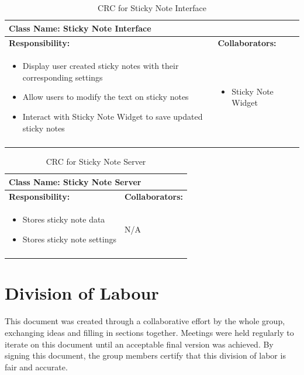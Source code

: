 \documentclass[]{article}
\begin{document}
\begin{longtable}{| p{} | p{} |}
	\hline
	\multicolumn{2}{|l|}{\textbf{Class Name: Sticky Note Interface}} \\
	\hline
	\textbf{Responsibility:} & \textbf{Collaborators:} \\
	\hline
	\begin{itemize}
		\item Display user created sticky notes with their corresponding settings
		\item Allow users to modify the text on sticky notes
		\item Interact with Sticky Note Widget to save updated sticky notes
    \end{itemize} & 
	\begin{itemize}
		\item Sticky Note Widget
	\end{itemize} \\
	\hline
	\caption{CRC for Sticky Note Interface}
\end{longtable}

\begin{longtable}{| p{} | p{} |}
	\hline
	\multicolumn{2}{|l|}{\textbf{Class Name: Sticky Note Server}} \\
	\hline
	\textbf{Responsibility:} & \textbf{Collaborators:} \\
	\hline
	\begin{itemize}
		\item Stores sticky note data
		\item Stores sticky note settings
    \end{itemize} & \newline \newline N/A \\
	\hline
	\caption{CRC for Sticky Note Server}
\end{longtable}


\appendix

\newpage
\section{Division of Labour}
\label{sec:division_of_labour}
This document was created through a collaborative effort by the whole group, exchanging ideas and filling in sections together. Meetings were held regularly to iterate on this document until an acceptable final version was achieved. By signing this document, the group members certify that this division of labor is fair and accurate.
\end{document}
